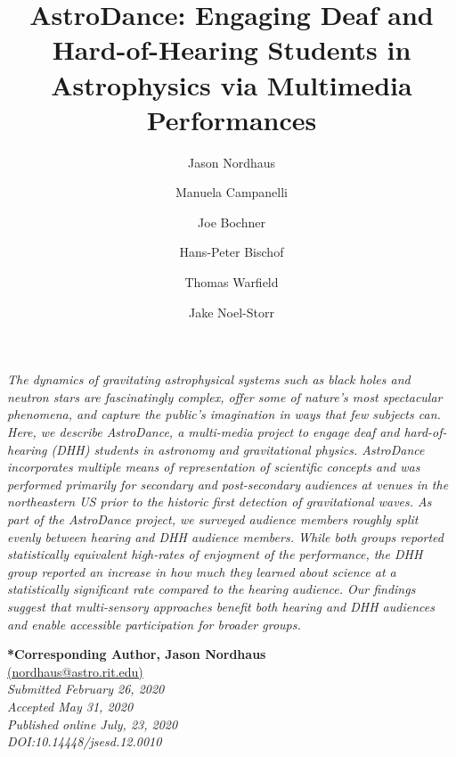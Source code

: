 \documentclass[11.5pt]{sig-alternate} %
\makeatletter
\let\oldabstract\abstract
\let\oldendabstract\endabstract
\renewenvironment{abstract} %
{\renewenvironment{quotation}%
               {\list{}{\addtolength{\leftmargin}{1em} %
                        \listparindent 1.5em%
                        \itemindent    \listparindent%
                        \rightmargin   \leftmargin%
                        \parsep        \z@ \@plus\p@}%
                \item\relax}%
               {\endlist}%
\oldabstract}
{\oldendabstract}
\makeatother
\begin{document}
\title{AstroDance: Engaging Deaf and Hard-of-Hearing Students in Astrophysics via Multimedia Performances}

\author[1]{\large \color{blue}Jason Nordhaus}
\author[1]{\large \color{blue}Manuela Campanelli}
\author[1]{\large \color{blue}Joe Bochner}
\author[1]{\large \color{blue}Hans-Peter Bischof}
\author[1]{\large \color{blue}Thomas Warfield}
\author[2]{\large \color{blue}Jake Noel-Storr}



\toappear{}
\maketitle
\begin{@twocolumnfalse} 
\begin{abstract}
\item 
\textit {The dynamics of gravitating astrophysical systems such as black holes and neutron stars are fascinatingly complex, offer some of nature's most spectacular phenomena, and capture the public's imagination in ways that few subjects can. Here, we describe AstroDance, a multi-media project to engage deaf and hard-of-hearing (DHH) students in astronomy and gravitational physics. AstroDance incorporates multiple means of representation of scientific concepts and was performed primarily for secondary and post-secondary audiences at  venues in the northeastern US prior to the historic first detection of gravitational waves. As part of the AstroDance project, we surveyed  audience members roughly split evenly between hearing and DHH audience members. While both groups reported statistically equivalent high-rates of enjoyment of the performance, the DHH group reported an increase in how much they learned about science at a statistically significant rate compared to the hearing audience. Our findings suggest that multi-sensory approaches benefit both hearing and DHH audiences and enable accessible participation for broader groups.}
\\ 
\end{abstract}
\end{@twocolumnfalse}


\textbf{*Corresponding Author, Jason Nordhaus}\\
\href{mailto: nordhaus@astro.rit.edu }{(nordhaus@astro.rit.edu)} \\
\textit{Submitted February 26, 2020 }\\
\textit{Accepted May 31, 2020 } \\
\textit{Published online July, 23, 2020} \\
\textit{DOI:10.14448/jsesd.12.0010} \\
\pagebreak
\clearpage
\end{document}

